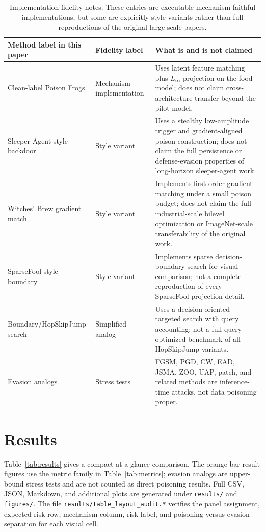 ﻿\documentclass[6p,10pt,times]{ieeeaccess}
\begin{document}
\begin{table}[t]
\centering
\caption{Implementation fidelity notes. These entries are executable mechanism-faithful implementations, but some are explicitly style variants rather than full reproductions of the original large-scale papers.}
\label{tab:fidelity}
\small
\begin{tabular}{p{}p{}p{}}
\toprule
Method label in this paper & Fidelity label & What is and is not claimed \\
\midrule
Clean-label Poison Frogs & Mechanism implementation & Uses latent feature matching plus \(L_\infty\) projection on the food model; does not claim cross-architecture transfer beyond the pilot model. \\
Sleeper-Agent-style backdoor & Style variant & Uses a stealthy low-amplitude trigger and gradient-aligned poison construction; does not claim the full persistence or defense-evasion properties of long-horizon sleeper-agent work. \\
Witches' Brew gradient match & Style variant & Implements first-order gradient matching under a small poison budget; does not claim the full industrial-scale bilevel optimization or ImageNet-scale transferability of the original work. \\
SparseFool-style boundary & Style variant & Implements sparse decision-boundary search for visual comparison; not a complete reproduction of every SparseFool projection detail. \\
Boundary/HopSkipJump search & Simplified analog & Uses a decision-oriented targeted search with query accounting; not a full query-optimized benchmark of all HopSkipJump variants. \\
Evasion analogs & Stress tests & FGSM, PGD, CW, EAD, JSMA, ZOO, UAP, patch, and related methods are inference-time attacks, not data poisoning proper. \\
\bottomrule
\end{tabular}
\end{table}

\section{Results}

Table~\ref{tab:results} gives a compact at-a-glance comparison. The orange-bar result figures use the metric family in Table~\ref{tab:metrics}; evasion analogs are upper-bound stress tests and are not counted as direct poisoning results. Full CSV, JSON, Markdown, and additional plots are generated under \texttt{results/} and \texttt{figures/}. The file \texttt{results/table\_layout\_audit.*} verifies the panel assignment, expected risk row, mechanism column, risk label, and poisoning-versus-evasion separation for each visual cell.
\end{document}
